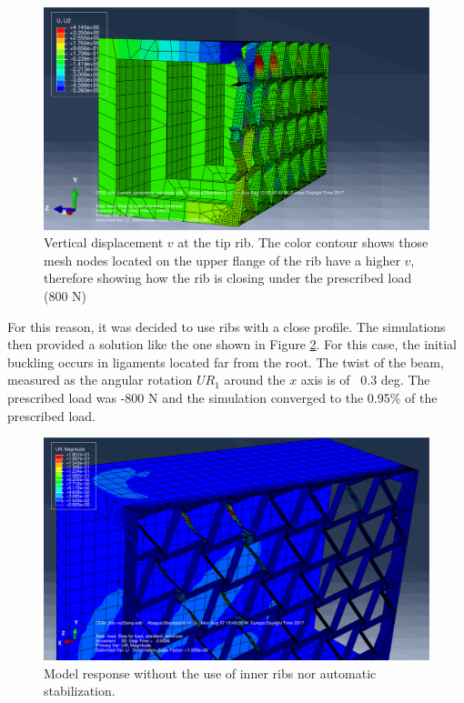     \begin{figure}[!htpb]
      \centering
      \includegraphics[width=0.8 \textwidth]{../figures/result-model/closeOfRib-800N}
      \caption[Vertical displacement $v$ at the tip rib]{Vertical displacement $v$ at the tip rib. The color contour shows those mesh nodes located on the upper flange of the rib have a higher $v$, therefore showing how the rib is closing under the prescribed load (800 N)}\label{fig:closeOfRib-800N}
    \end{figure}

    For this reason, it was decided to use ribs with a close profile. The simulations then provided a solution like the one shown in Figure \ref{fig:normalCaseNoDampNoInnerRibs_800N}. For this case, the initial buckling occurs in ligaments located far from the root. The twist of the beam, measured as the angular rotation $UR_1$ around the $x$ axis is of ~0.3 deg. The prescribed load was -800 N and the simulation converged to the 0.95\% of the prescribed load.

    \begin{figure}[!htpb]
      \centering
      \includegraphics[width=0.8 \textwidth]{../figures/result-model/normalCaseNoDampNoInnerRibs_800N}
      \caption[Model response without the use of inner ribs nor automatic stabilization]{Model response without the use of inner ribs nor automatic stabilization.}\label{fig:normalCaseNoDampNoInnerRibs_800N}
    \end{figure}

